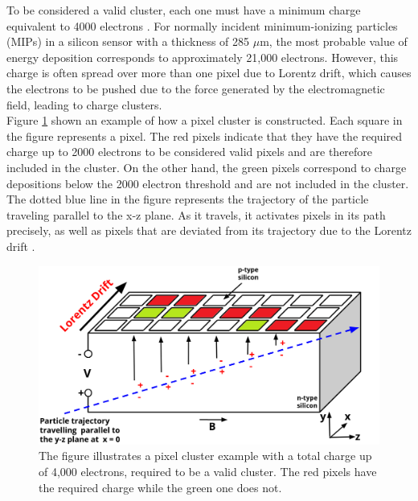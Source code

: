 To be considered a valid cluster, each one must have a minimum charge equivalent to 4000 electrons \cite{Track_Reco_2014,phase1_Pixel_Detector}. For normally incident minimum-ionizing particles (MIPs) in a silicon sensor with a thickness of 285 $\mu \text{m}$, the most probable value of energy deposition corresponds to approximately 21,000 electrons. However, this charge is often spread over more than one pixel due to Lorentz drift,  which causes the electrons to be pushed due to the force generated by the electromagnetic field, leading to charge clusters.\\

Figure \ref{cluster}  shown an example of how a pixel cluster is constructed. Each square in the figure represents a pixel. The red pixels indicate that they have the required charge up to 2000 electrons to be considered valid pixels and are therefore included in the cluster. On the other hand, the green pixels correspond to charge depositions below the 2000 electron threshold and are not included in the cluster.
The dotted blue line in the figure represents the trajectory of the particle traveling parallel to the x-z plane. As it travels, it activates pixels in its path precisely, as well as pixels that are deviated from its trajectory due to the Lorentz drift \cite{Pixel_Hit_Reconstruction}.\\
\newpage
\begin{center}
  \begin{figure}[h]
    \centering
    \includegraphics[scale=.25]{Chapter2/pixel_cluster.png} 
    \caption[Pixel cluster]{ The figure illustrates a pixel cluster example with a total charge up of 4,000 electrons, required to be a valid cluster. The red pixels have the required charge while the green one does not.}
    \label{cluster}
  \end{figure}
\end{center}
